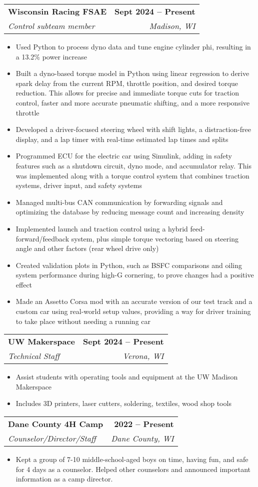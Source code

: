 \documentclass[letterpaper,11pt]{article}
\makeatletter
\newcommand{\resumeItem}[1]{
  \item\small{
    {#1 \vspace{-2pt}}
  }
}
\newcommand{\resumeSubheading}[4]{
  \vspace{-2pt}\item
    \begin{tabular*}{1.0\textwidth}[t]{l@{\extracolsep{\fill}}r}
      \textbf{#1} & \textbf{\small #2} \\
      \textit{\small#3} & \textit{\small #4} \\
    \end{tabular*}\vspace{-7pt}
}
\newcommand{\resumeItemListStart}{\begin{itemize}}
\newcommand{\resumeItemListEnd}{\end{itemize}\vspace{-5pt}}
\makeatother
\begin{document}
    \resumeSubheading
      {Wisconsin Racing FSAE}{Sept 2024 -- Present}
      {Control subteam member}{Madison, WI}
      \resumeItemListStart
        \resumeItem{Used Python to process dyno data and tune engine cylinder phi, resulting in a 13.2\% power increase}
        \resumeItem{Built a dyno-based torque model in Python using linear regression to derive spark delay from the current RPM, throttle position, and desired torque reduction. This allows for precise and immediate torque cuts for traction control, faster and more accurate pneumatic shifting, and a more responsive throttle}
        \resumeItem{Developed a driver-focused steering wheel with shift lights, a distraction-free display, and a lap timer with real-time estimated lap times and splits}
        \resumeItem{Programmed ECU for the electric car using Simulink, adding in safety features such as a shutdown circuit, dyno mode, and accumulator relay. This was implemented along with a torque control system that combines traction systems, driver input, and safety systems}
        \resumeItem{Managed multi-bus CAN communication by forwarding signals and optimizing the database by reducing message count and increasing density}
        \resumeItem{Implemented launch and traction control using a hybrid feed-forward/feedback system, plus simple torque vectoring based on steering angle and other factors (rear wheel drive only)}
        \resumeItem{Created validation plots in Python, such as BSFC comparisons and oiling system performance during high-G cornering, to prove changes had a positive effect}
        \resumeItem{Made an Assetto Corsa mod with an accurate version of our test track and a custom car using real-world setup values, providing a way for driver training to take place without needing a running car}
      \resumeItemListEnd

    \resumeSubheading
      {UW Makerspace}{Sept 2024 -- Present}
      {Technical Staff}{Verona, WI}
      \resumeItemListStart
        \resumeItem{Assist students with operating tools and equipment at the UW Madison Makerspace}
        \resumeItem{Includes 3D printers, laser cutters, soldering, textiles, wood shop tools}
      \resumeItemListEnd

    \resumeSubheading
      {Dane County 4H Camp}{2022 -- Present}
      {Counselor/Director/Staff}{Dane County, WI}
      \resumeItemListStart
      \resumeItem{Kept a group of 7-10 middle-school-aged boys on time, having fun, and safe for 4 days as a counselor. Helped other counselors and announced important information as a camp director.}
      \resumeItemListEnd
    
\end{document}
